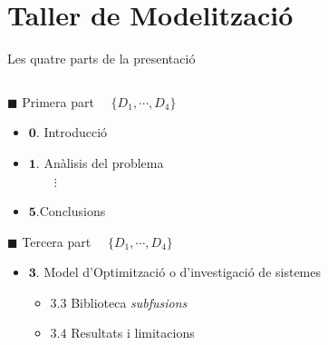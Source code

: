 \documentclass[twocolumn]{beamer}
\begin{document}
\section{Taller de Modelització}
\begin{frame} 
\maketitle
\centering

\end{frame}
\begin{frame}{Les quatre parts de la presentació}
\begin{columns}[t]
\begin{column}{.5\textwidth}
       \begin{block}{$\blacksquare$ Primera part $\quad\{  D_1,\cdots,D_4\}$}
       	\begin{itemize}
       		\small
       		\item $\mathbf{0.}$ Introducció
       		\item $\mathbf{1.}$ Anàlisis del problema \\ $\quad \quad \vdots$
       		\item $\mathbf{5.}$Conclusions
       	\end{itemize}
       \normalsize
       \end{block}
  \begin{block}{$\blacksquare$ Tercera part $\quad\{  D_1,\cdots,D_4\}$}
  	\begin{itemize}
  		\small
  		\item $\mathbf{3.}$ Model d’Optimització o d’investigació de sistemes
  		\begin{itemize}
  			\footnotesize
  			\item $\mathbf{3.3}$ Biblioteca \textit{subfusions}
  			\item $\mathbf{3.4}$ Resultats i limitacions 
  		\end{itemize}
  	\end{itemize}
  \end{block}
\end{column}
\begin{column}{.5\textwidth}


\end{column}
\end{columns}
\end{frame}
\end{document}
